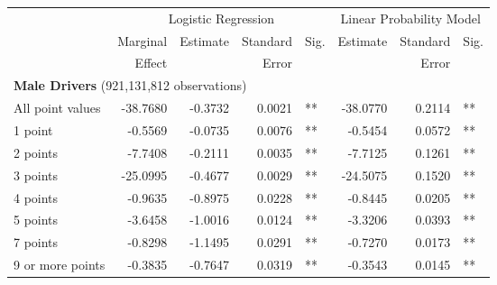 
\begin{table}%
\centering 
\begin{tabular}{l r r r l r r l} 

\hline 
 
 & \multicolumn{4}{c}{Logistic Regression}  & \multicolumn{3}{c}{Linear Probability Model} \\ 

 \cmidrule(lr){2-5}\cmidrule(lr){6-8} 
 & Marginal & Estimate & Standard & Sig. & Estimate & Standard & Sig. \\ 
 &   Effect &          &  Error   &      &          &  Error   &     \\ 

\hline 
 
\multicolumn{7}{l}{\textbf{Male Drivers} (921,131,812 observations)} \\ 

All point values                &  -38.7680       &  -0.3732        &  0.0021       &   **       &  -38.0770        &  0.2114       &   **       \\ 
1 point                         &  -0.5569       &  -0.0735        &  0.0076       &   **       &  -0.5454        &  0.0572       &   **       \\ 
2 points                        &  -7.7408       &  -0.2111        &  0.0035       &   **       &  -7.7125        &  0.1261       &   **       \\ 
3 points                        &  -25.0995       &  -0.4677        &  0.0029       &   **       &  -24.5075        &  0.1520       &   **       \\ 
4 points                        &  -0.9635       &  -0.8975        &  0.0228       &   **       &  -0.8445        &  0.0205       &   **       \\ 
5 points                        &  -3.6458       &  -1.0016        &  0.0124       &   **       &  -3.3206        &  0.0393       &   **       \\ 
7 points                        &  -0.8298       &  -1.1495        &  0.0291       &   **       &  -0.7270        &  0.0173       &   **       \\ 
9 or more points                &  -0.3835       &  -0.7647        &  0.0319       &   **       &  -0.3543        &  0.0145       &   **       \\ 


\end{tabular}
\end{table}
